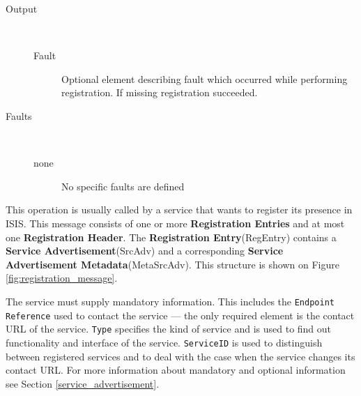 \documentclass{book}
\begin{document}
\begin{description}
  \item[Output]~\begin{description}
    \item[Fault] Optional element describing fault which occurred while performing registration. If missing registration succeeded.
  \end{description}

  \item[Faults]~\begin{description}
    \item[none]No specific faults are defined
  \end{description}

\end{description}

This operation is usually called by a service that wants to register its presence in ISIS. This message consists of one or more \textbf{Registration Entries} and at most one \textbf{Registration Header}. The \textbf{Registration Entry}(RegEntry) contains a \textbf{Service Advertisement}(SrcAdv) and a corresponding \textbf{Service Advertisement Metadata}(MetaSrcAdv). This structure is shown on Figure \ref{fig:registration_message}.
\begin{figure}[ht]
\end{figure}

The service must supply mandatory information. This includes the \texttt{Endpoint Reference} used to contact the service --- the only required element is the contact URL of the service. \texttt{Type} specifies the kind of service and is used to find out functionality and interface of the service. \texttt{ServiceID} is used to distinguish between registered services and to deal with the case when the service changes its contact URL. For more information about mandatory and optional information see Section \ref{service_advertisement}.
\end{document}

